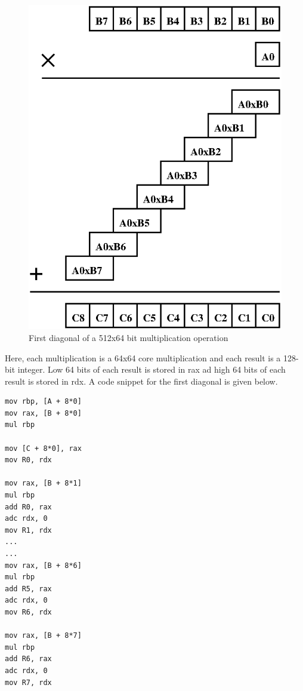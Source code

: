 \documentclass[twocolumn]{svjour3}          %
\begin{document}
\begin{figure}[ht]
\centering
  \includegraphics[scale=0.7]{multdiag0.eps}
\caption{First diagonal of a 512x64 bit multiplication operation}
\label{fig:diag0}
\end{figure}

Here, each multiplication is a 64x64 core multiplication and each result is a 128-bit integer. Low 64 bits of each result is stored in rax ad high 64 bits of each result is stored in rdx. A code snippet for the first diagonal is given below.


\begin{verbatim}
mov rbp, [A + 8*0]
mov rax, [B + 8*0]
mul rbp

mov [C + 8*0], rax
mov R0, rdx

mov rax, [B + 8*1]
mul rbp
add R0, rax
adc rdx, 0
mov R1, rdx
...
...
mov rax, [B + 8*6]
mul rbp
add R5, rax
adc rdx, 0
mov R6, rdx

mov rax, [B + 8*7]
mul rbp
add R6, rax
adc rdx, 0
mov R7, rdx
\end{verbatim}
\end{document}
